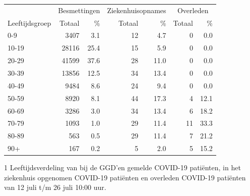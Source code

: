 \documentclass[
  english,
  man,floatsintext]{apa6}
\begin{document}
\begin{table}
\centering\begingroup\fontsize{11}{13}\selectfont

\begin{threeparttable}
\begin{tabular}{lrrrrrr}
\toprule
\multicolumn{1}{c}{ } & \multicolumn{2}{c}{Besmettingen} & \multicolumn{2}{c}{Ziekenhuisopnames} & \multicolumn{2}{c}{Overleden} \\
\cmidrule(l{3pt}r{3pt}){2-3} \cmidrule(l{3pt}r{3pt}){4-5} \cmidrule(l{3pt}r{3pt}){6-7}
Leeftijdsgroep & Totaal & \% & Totaal & \% & Totaal & \%\\
\midrule
0-9 & 3407 & 3.1 & 12 & 4.7 & 0 & 0.0\\
10-19 & 28116 & 25.4 & 15 & 5.9 & 0 & 0.0\\
20-29 & 41599 & 37.6 & 28 & 11.0 & 0 & 0.0\\
30-39 & 13856 & 12.5 & 34 & 13.4 & 0 & 0.0\\
40-49 & 9484 & 8.6 & 24 & 9.4 & 0 & 0.0\\
50-59 & 8920 & 8.1 & 44 & 17.3 & 4 & 12.1\\
60-69 & 3286 & 3.0 & 34 & 13.4 & 6 & 18.2\\
70-79 & 1093 & 1.0 & 29 & 11.4 & 11 & 33.3\\
80-89 & 563 & 0.5 & 29 & 11.4 & 7 & 21.2\\
90+ & 167 & 0.2 & 5 & 2.0 & 5 & 15.2\\
\bottomrule
\end{tabular}
\begin{tablenotes}
\item[1] Leeftijdsverdeling van bij de GGD’en gemelde COVID-19 patiënten, in het ziekenhuis opgenomen COVID-19 patiënten en overleden COVID-19 patiënten van 12 juli t/m 26 juli 10:00 uur.
\end{tablenotes}
\end{threeparttable}
\endgroup{}
\end{table}

\newpage
\end{document}
